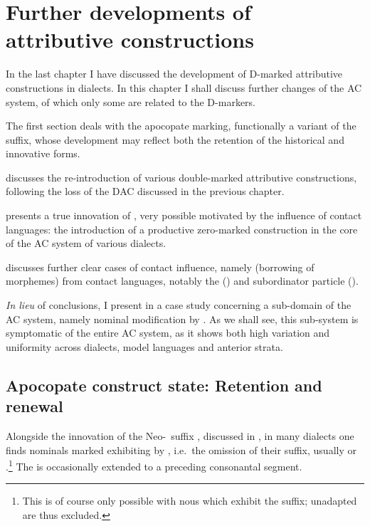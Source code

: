 





\chapter{Further developments of attributive constructions}

In the last chapter I have discussed the development of D-marked attributive constructions in  dialects. In this chapter I shall discuss further changes of the AC system, of which only some are related to the D-markers. 

The first section deals with the apocopate  marking, functionally a variant of the \ed suffix, whose development may reflect both the retention of the historical \cst* and innovative forms. 

 discusses the re-introduction of various double-marked attributive constructions, following the loss of the DAC discussed in the previous chapter. 

 presents a true innovation of , very possible motivated by the influence of contact languages: the introduction of a productive zero-marked  construction in the core of the AC system of various dialects. 

 discusses further clear cases of contact influence, namely  (borrowing of morphemes) from contact languages, notably the  \ez* () and subordinator particle ({}).

\textit{In lieu} of conclusions, I present in  a case study concerning a sub-domain of the AC system, namely nominal modification by . As we shall see, this sub-system is symptomatic of the entire AC system, as it shows both high variation and uniformity across dialects, model languages and anterior strata. 


\largerpage
\section{Apocopate construct state: Retention and renewal} \label{ss:apcopate}

Alongside the innovation of the Neo-\cst\ suffix \ed, discussed in , in many  dialects one finds nominals marked exhibiting \cst* by , i.e.\ the omission of their \free* suffix, usually  or .\footnote{This is of course only possible with nous which exhibit the \free* suffix; unadapted  are thus excluded.} The  is occasionally extended to a preceding consonantal segment.

